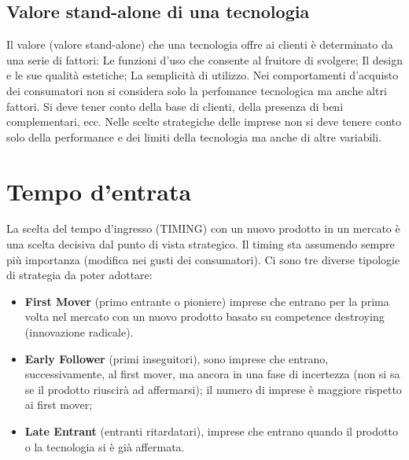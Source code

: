 \documentclass{article}
\begin{document}
\subsection{Valore stand-alone di una tecnologia}
Il valore (valore stand-alone) che una tecnologia offre ai clienti è determinato da una serie di
fattori:
Le funzioni d’uso che consente al fruitore di svolgere;
Il design e le sue qualità estetiche;
La semplicità di utilizzo.
Nei comportamenti d’acquisto dei consumatori non si considera solo la perfomance tecnologica
ma anche altri fattori.
Si deve tener conto della base di clienti, della presenza di beni complementari, ecc.
Nelle scelte strategiche delle imprese non si deve tenere conto solo della performance e dei limiti
della tecnologia ma anche di altre variabili.

\section{Tempo d'entrata}
La scelta del tempo d’ingresso (TIMING) con un nuovo prodotto in un mercato è una scelta
decisiva dal punto di vista strategico. Il timing sta assumendo sempre più importanza (modifica nei
gusti dei consumatori).
Ci sono tre diverse tipologie di strategia da poter adottare:
\begin{itemize}
	\item \textbf{First Mover} (primo entrante o pioniere) imprese che entrano per la prima volta nel
	mercato con un nuovo prodotto basato su competence destroying (innovazione
	radicale).
	\item \textbf{Early Follower} (primi inseguitori), sono imprese che entrano, successivamente, al
	first mover, ma ancora in una fase di incertezza (non si sa se il prodotto riuscirà ad
	affermarsi); il numero di imprese è maggiore rispetto ai first mover;
	\item \textbf{Late Entrant} (entranti ritardatari), imprese che entrano quando il prodotto o la
	tecnologia si è già affermata.
\end{itemize}
\end{document}
